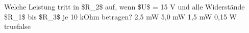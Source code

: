     {Welche Leistung tritt in \$R\_2\$ auf, wenn \$U\$ = 15 V und alle Widerstände \$R\_1\$ bis \$R\_3\$ je 10 kOhm betragen? }
    {2,5 mW}
    {5,0 mW}
    {1,5 mW}
    {0,15 W}
    {true}{false}